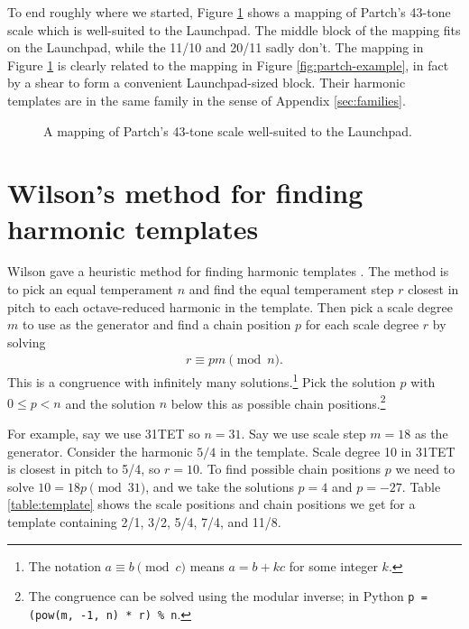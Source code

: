 \documentclass[a4paper,11pt]{article}
\begin{document}
To end roughly where we started, Figure \ref{fig:partch-launchpad} shows a
mapping of Partch's 43-tone scale which is well-suited to the Launchpad. The
middle block of the mapping fits on the Launchpad, while the 11/10 and 20/11
sadly don't. The mapping in Figure \ref{fig:partch-launchpad} is clearly
related to the mapping in Figure \ref{fig:partch-example}, in fact by a shear
to form a convenient Launchpad-sized block. Their harmonic templates are in the
same family in the sense of Appendix \ref{sec:families}.

\begin{figure}
\begin{center}

\end{center}
\caption{A mapping of Partch's 43-tone scale well-suited to the Launchpad.}
\label{fig:partch-launchpad}
\end{figure}

\clearpage
\appendix

\appendixpage

\section{Wilson's method for finding harmonic templates}
\label{sec:heuristic}
Wilson gave a heuristic method for finding harmonic templates
\cite{wilsonharmonic}. The method is to pick an equal temperament $n$ and find
the equal temperament step $r$ closest in pitch to each octave-reduced harmonic
in the template. Then pick a scale degree $m$ to use as the generator and find
a chain position $p$ for each scale degree $r$ by solving
\begin{align}
    r \equiv pm \pmod{n}.
\end{align}
This is a congruence with infinitely many solutions.\footnote{The notation $a
\equiv b \pmod c$ means $a = b + kc$ for some integer $k$.} Pick the solution
$p$ with $0 \leq p < n$ and the solution $n$ below this as possible chain
positions.\footnote{The congruence can be solved using the modular inverse; in
Python \texttt{p = (pow(m, -1, n) * r) \% n}.}

For example, say we use 31TET so $n = 31$. Say we use scale step $m = 18$ as
the generator. Consider the harmonic $5/4$ in the template. Scale degree 10 in
31TET is closest in pitch to 5/4, so $r = 10$. To find possible chain positions
$p$ we need to solve $10 = 18 p \pmod{31}$, and we take the solutions $p = 4$
and $p = -27$.  Table \ref{table:template} shows the scale positions and chain
positions we get for a template containing 2/1, 3/2, 5/4, 7/4, and 11/8.
\end{document}
